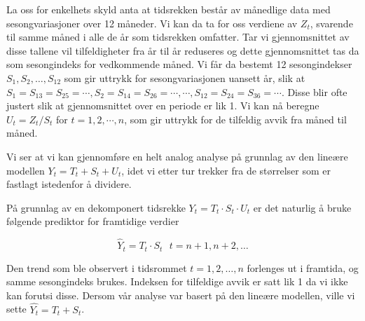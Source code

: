 La oss for enkelhets skyld anta at tidsrekken består av månedlige
data med sesongvariasjoner over 12 måneder.  Vi kan da ta for oss 
verdiene av $Z_t$, svarende til samme måned i alle de år som
tidsrekken omfatter.  Tar vi gjennomsnittet av disse tallene vil 
tilfeldigheter fra år til år reduseres og dette gjennomsnittet tas
da som sesongindeks for vedkommende måned.  Vi får da bestemt 12
sesongindekser $S_1, S_2,\ldots, S_{12}$ som gir uttrykk for sesongvariasjonen
uansett år, slik at
 $S_1 = S_{13} = S_{25} = \cdots, S_2 = S_{14} = S_{26}= \cdots,
\cdots, S_{12} = S_{24} =S_{36} = \cdots$.  Disse blir ofte justert slik at
gjennomsnittet over en periode er lik 1. Vi kan nå beregne $U_t = Z_t/S_t$
 for $t = 1, 2, \cdots, n$, som gir uttrykk for de tilfeldig avvik fra 
måned til måned.

Vi ser at vi kan gjennomføre en helt analog analyse på grunnlag av
den lineære modellen $Y_t = T_t + S_t + U_t$, idet vi etter tur trekker
fra de størrelser som er fastlagt istedenfor å dividere.

På grunnlag av en dekomponert tidsrekke $Y_t = T_t \cdot S_t \cdot U_t$
er det naturlig å bruke følgende prediktor for framtidige verdier

\[ \hat{Y}_t=T_t \cdot S_t \mbox{\ \ \ \ } t=n+1,n+2, \ldots  \]

\noindent Den trend som ble observert i tidsrommet $t = 1,2,\ldots, n$
forlenges ut i framtida, og samme sesongindeks brukes.  Indeksen for
tilfeldige avvik er satt lik 1 da vi ikke kan forutsi disse.
Dersom vår analyse var basert på den lineære modellen,
ville vi sette $\hat{Y_t} = T_t + S_t$.\\

